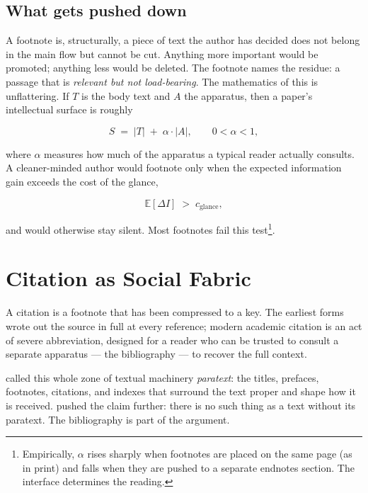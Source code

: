 \documentclass{article}
\providecommand{\vfid}[1]{}
\providecommand{\vcid}[1]{}
\begin{document}
\subsection{What gets pushed down}
\label{sec:pushdown} %

A footnote is, structurally, a piece of text the author has decided does not belong in the main flow but cannot be cut. Anything more important would be promoted; anything less would be deleted. The footnote names the residue: a passage that is \emph{relevant but not load-bearing}. The mathematics of this is unflattering. If $T$ is the body text and $A$ the apparatus, then a paper's intellectual surface is roughly %

\[
S \;=\; |T| \;+\; \alpha \cdot |A|, \qquad 0 < \alpha < 1,
\] %

where $\alpha$ measures how much of the apparatus a typical reader actually consults. A cleaner-minded author would footnote only when the expected information gain exceeds the cost of the glance, %

\[
\mathbb{E}[\Delta I] \;>\; c_{\text{glance}},
\] %

and would otherwise stay silent. Most footnotes fail this test\vfid{f005}\footnote{Empirically, $\alpha$ rises sharply when footnotes are placed on the same page (as in print) and falls when they are pushed to a separate endnotes section. The interface determines the reading.}. %

\section{Citation as Social Fabric}
\label{sec:citation} %

A citation is a footnote that has been compressed to a key. The earliest forms wrote out the source in full at every reference; modern academic citation is an act of severe abbreviation, designed for a reader who can be trusted to consult a separate apparatus --- the bibliography --- to recover the full context. %

\vcid{cc06}\citet{genette1997} called this whole zone of textual machinery \emph{paratext}: the titles, prefaces, footnotes, citations, and indexes that surround the text proper and shape how it is received. \vcid{cc07}\citet{mckenzie1999} pushed the claim further: there is no such thing as a text without its paratext. The bibliography is part of the argument. %
\end{document}
